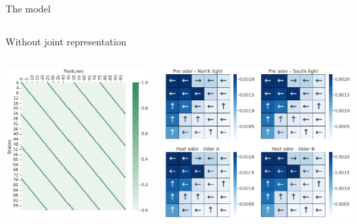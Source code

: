 \documentclass[bigger]{beamer}
\begin{document}
\begin{frame}[label={sec:org9c5eeba}]{The model}
\begin{columns}
\begin{column}{0.5\columnwidth}
\begin{center}
\end{center}
\end{column}
\end{columns}
\end{frame}
\begin{frame}[label={sec:org1d842ec}]{Without joint representation}
\begin{columns}
\begin{column}{0.5\columnwidth}
\begin{center}
\includegraphics[height=0.4\textheight]{img/features-allo-no-joint-repr.png}
\end{center}
\end{column}
\begin{column}{0.5\columnwidth}
\begin{center}
\includegraphics[width=\textwidth]{img/policy-allo-no-joint-repr.png}

\end{center}
\end{column}
\end{columns}
\end{frame}
\end{document}
